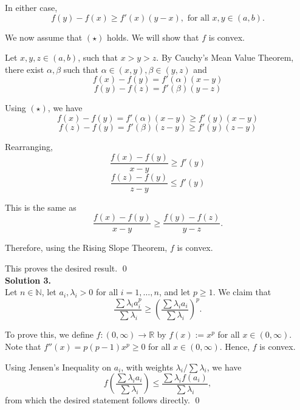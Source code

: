 \documentclass[10pt]{article}
\begin{document}
        In either case,
        \[f(y) - f(x) \ge f'(x)(y - x), \text{ for all } x, y \in (a, b).\]


        We now assume that $(\star)$ holds. We will show that $f$ is convex.

        Let $x, y, z \in (a, b)$, such that $x > y > z$. By Cauchy's Mean Value Theorem, there exist $\alpha, \beta$ such that
        $\alpha \in (x, y), \beta \in (y, z)$ and
        \[f(x) - f(y) = f'(\alpha)(x - y)\]
        \[f(y) - f(z) = f'(\beta)(y - z)\]

        Using $(\star)$, we have
        \[f(x) - f(y) = f'(\alpha)(x - y) \ge f'(y)(x - y)\]
        \[f(z) - f(y) = f'(\beta)(z - y) \ge f'(y)(z - y)\]

        Rearranging,
        \[\frac{f(x) - f(y)}{x - y} \ge f'(y)\]
        \[\frac{f(z) - f(y)}{z - y} \le f'(y)\]

        This is the same as
        \[\frac{f(x) - f(y)}{x - y} \ge \frac{f(y) - f(z)}{y - z}.\]

        Therefore, using the Rising Slope Theorem, $f$ is convex.

        This proves the desired result. \qed\\

        
        \textbf{Solution 3.}\\
        Let $n \in \mathbb{N}$, let $a_i, \lambda_i > 0$ for all $i = 1, \dotsc, n$, and let $p \ge 1$. We claim that
        \[\frac{\sum \lambda_i a_i^p}{\sum \lambda_i} \ge \left(\frac{\sum \lambda_i a_i}{\sum \lambda_i}\right)^p.\]

        To prove this, we define $f\colon (0, \infty) \to \mathbb{R}$ by $f(x) := x^p$ for all $x \in (0, \infty)$.
        Note that $f''(x) = p(p-1)x^p \ge 0$ for all $x \in (0, \infty)$. Hence, $f$ is convex.

        Using Jensen's Inequality on $a_i$, with weights $\lambda_i / \sum \lambda_i$, we have
        \[f\left(\frac{\sum\lambda_i a_i}{\sum{\lambda_i}}\right) \le \frac{\sum \lambda_i f(a_i)}{\sum \lambda_i},\]
        from which the desired statement follows directly. \qed\\
\end{document}
